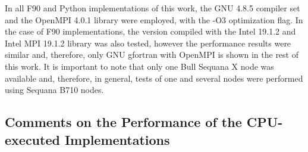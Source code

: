 \documentclass[12pt]{article}
\begin{document}
In all F90 and Python implementations of this work, the GNU 4.8.5 compiler set and the OpenMPI 4.0.1 library were employed, with the -O3 optimization flag. In the case of F90 implementations, the version compiled with the Intel 19.1.2 and Intel MPI 19.1.2 library was also tested, however the performance results were similar and, therefore, only GNU gfortran with OpenMPI is shown in the rest of this work. It is important to note that only one Bull Sequana X node was available and, therefore, in general, tests of one and several nodes were performed using Sequana B710 nodes.




\subsection{Comments on the Performance of the CPU-executed Implementations}
\label{ssec:cpuexec}
\end{document}
